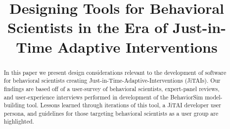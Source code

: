 \documentclass{sigchi}
\begin{document}
\title{Designing Tools for Behavioral Scientists in the Era of Just-in-Time Adaptive Interventions}


\maketitle

\begin{abstract}
In this paper we present design considerations relevant to the development of software for behavioral scientists creating Just-in-Time-Adaptive-Interventions (JiTAIs). 
Our findings are based off of a user-survey of behavioral scientists, expert-panel reviews, and user-experience interviews performed in development of the BehaviorSim model-building tool. 
Lessons learned through iterations of this tool, a JiTAI developer user persona, and guidelines for those targeting behavioral scientists as a user group are highlighted. 
\end{abstract}
\end{document}
